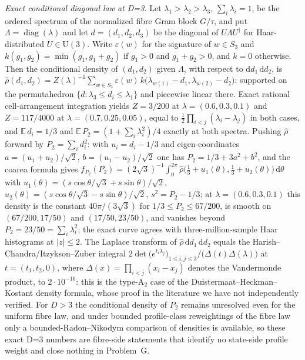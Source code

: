 \emph{Exact conditional diagonal law at D=3.} Let $\lambda_{1}>\lambda_{2}>\lambda_{3}$, $\textstyle\sum_{i}\lambda_{i}=1$, be the ordered spectrum of the normalized fibre Gram block $G/\tau$, and put $\Lambda=\operatorname{diag}(\lambda)$ and let $d=(d_{1},d_{2},d_{3})$ be the diagonal of $U\Lambda U^{\dagger}$ for Haar-distributed $U\in\mathrm{U}(3)$. Write $\varepsilon(w)$ for the signature of $w\in S_{3}$ and $k(g_{1},g_{2})=\min(g_{1},g_{1}+g_{2})$ if $g_{1}>0$ and $g_{1}+g_{2}>0$, and $k=0$ otherwise. Then the conditional density of $(d_{1},d_{2})$ given $\Lambda$, with respect to $\mathrm{d}d_{1}\,\mathrm{d}d_{2}$, is $\widehat{\rho}(d_{1},d_{2})=Z(\lambda)^{-1}\sum_{w\in S_{3}}\varepsilon(w)\,k\bigl(\lambda_{w(1)}-d_{1},\lambda_{w(2)}-d_{2}\bigr)$: supported on the permutahedron $\{d:\lambda_{3}\le d_{i}\le\lambda_{1}\}$ and piecewise linear there. Exact rational cell-arrangement integration yields $Z=3/200$ at $\lambda=(0.6,0.3,0.1)$ and $Z=117/4000$ at $\lambda=(0.7,0.25,0.05)$, equal to $\tfrac{1}{2}\prod_{i<j}(\lambda_{i}-\lambda_{j})$ in both cases, and $\mathbb{E}\,d_{i}=1/3$ and $\mathbb{E}\,P_{2}=(1+\sum_{i}\lambda_{i}^{2})/4$ exactly at both spectra. Pushing $\widehat{\rho}$ forward by $P_{2}=\sum_{i}d_{i}^{2}$: with $u_{i}=d_{i}-1/3$ and eigen-coordinates $a=(u_{1}+u_{2})/\sqrt{2}$, $b=(u_{1}-u_{2})/\sqrt{2}$ one has $P_{2}=1/3+3a^{2}+b^{2}$, and the coarea formula gives $f_{P_{2}}(P_{2})=(2\sqrt{3})^{-1}\int_{0}^{2\pi}\widehat{\rho}\bigl(\tfrac{1}{3}+u_{1}(\theta),\tfrac{1}{3}+u_{2}(\theta)\bigr)\,\mathrm{d}\theta$ with $u_{1}(\theta)=(s\cos\theta/\sqrt{3}+s\sin\theta)/\sqrt{2}$, $u_{2}(\theta)=(s\cos\theta/\sqrt{3}-s\sin\theta)/\sqrt{2}$, $s^{2}=P_{2}-1/3$; at $\lambda=(0.6,0.3,0.1)$ this density is the constant $40\pi/(3\sqrt{3})$ for $1/3\le P_{2}\le 67/200$, is smooth on $(67/200,17/50)$ and $(17/50,23/50)$, and vanishes beyond $P_{2}=23/50=\sum_{i}\lambda_{i}^{2}$; the exact curve agrees with three-million-sample Haar histograms at $|z|\le2$. The Laplace transform of $\widehat{\rho}\,\mathrm{d}d_{1}\,\mathrm{d}d_{2}$ equals the Harish--Chandra/Itzykson--Zuber integral $2\det\bigl(e^{t_{i}\lambda_{j}}\bigr)_{1\le i,j\le3}/\bigl(\Delta(t)\Delta(\lambda)\bigr)$ at $t=(t_{1},t_{2},0)$, where $\Delta(x)=\prod_{i<j}(x_{i}-x_{j})$ denotes the Vandermonde product, to $2\cdot 10^{-16}$: this is the type-A$_{2}$ case of the Duistermaat--Heckman--Kostant density formula, whose proof in the literature we have not independently verified. For $D>3$ the conditional density of $P_{2}$ remains unresolved even for the uniform fibre law, and under bounded profile-class reweightings of the fibre law only a bounded-Radon--Nikodym comparison of densities is available, so these exact D=3 numbers are fibre-side statements that identify no state-side profile weight and close nothing in Problem~G.


